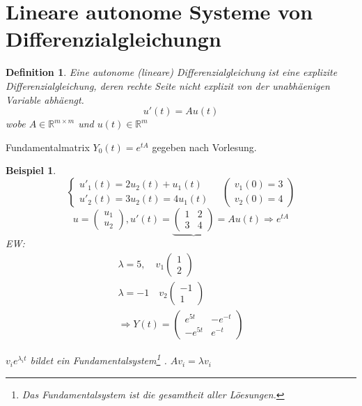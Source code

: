 \documentclass[11pt]{article}
\newcommand{\RR}{\mathbb{R}}
\newcounter{myCounter}[section]
\newtheorem{Def}[myCounter]{Definition}
\newtheorem{Bsp}[myCounter]{Beispiel}
\begin{document}
\section{Lineare autonome Systeme von Differenzialgleichungn}

\begin{Def}
  Eine autonome (lineare) Differenzialgleichung ist eine explizite Differenzialgleichung, deren rechte Seite nicht
  explizit von der unabh\"aenigen Variable abh\"aengt. \[
    u'(t) = A u(t) \]
  wobe  $A \in \RR^{m \times m}$ und $u(t) \in \RR^m$
\end{Def}

Fundamentalmatrix $Y_0(t) = e^{tA}$ gegeben nach Vorlesung.

\begin{Bsp}
  \[ \left\{ \begin{aligned} u'_1(t) = 2 u_2(t) + u_1(t) \\ u'_2(t) = 3 u_2(t) = 4
  u_1(t) \end{aligned} \right. \quad \begin{pmatrix} v_1(0) = 3 \\ v_2(0) = 4
\end{pmatrix} \] \[
  u = \begin{pmatrix} u_1 \\ u_2 \end{pmatrix}, u'(t) = \underbrace{\begin{pmatrix} 1 & 2 \\ 3
  & 4 \end{pmatrix}}{=A} u(t) \Rightarrow e^{tA}
  \]
  EW: \begin{align*}
     \lambda = 5, \quad v_1 \begin{pmatrix} 1 \\ 2 \end{pmatrix} \\ 
     \lambda =  -1 \quad v_2 \begin{pmatrix} -1 \\ 1 \end{pmatrix} \\
     \Rightarrow Y(t) = \begin{pmatrix} e^{5t} & -e^{-t} \\ -e^{5t} & e^{-t}
     \end{pmatrix}
   \end{align*}

   $v_i e^{\lambda_i t}$ bildet ein Fundamentalsystem\footnote{Das
   Fundamentalsystem ist die gesamtheit aller L\"oesungen.}
     . $Av_i = \lambda v_i$


\end{Bsp}
\end{document}
